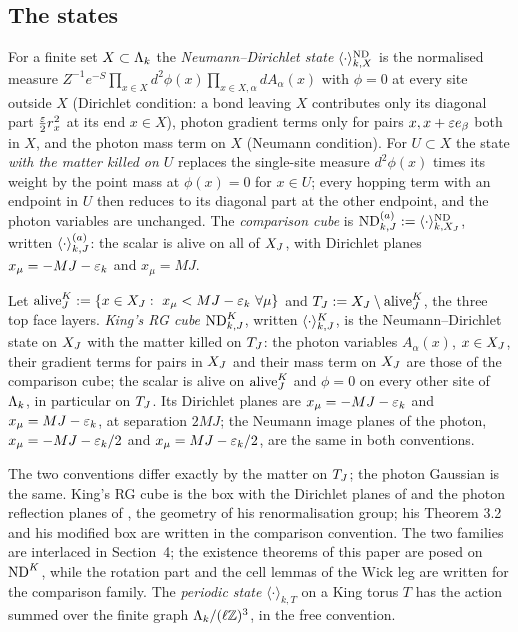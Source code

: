 \subsection{The states}

\begin{definition}\label{def:s02:acube}
For a finite set $X\subset\Lambda_k$ the \emph{Neumann--Dirichlet state} $\langle\cdot\rangle^{\mathrm{ND}}_{k,X}$ is the normalised measure $Z^{-1}e^{-S}\prod_{x\in X}d^2\phi(x)\prod_{x\in X,\alpha}dA_\alpha(x)$ with $\phi=0$ at every site outside $X$ (Dirichlet condition: a bond leaving $X$ contributes only its diagonal part $\frac{\varepsilon}2r_x^2$ at its end $x\in X$), photon gradient terms only for pairs $x,x+\varepsilon e_\beta$ both in $X$, and the photon mass term on $X$ (Neumann condition). For $U\subset X$ the state \emph{with the matter killed on $U$} replaces the single-site measure $d^2\phi(x)$ times its weight by the point mass at $\phi(x)=0$ for $x\in U$; every hopping term with an endpoint in $U$ then reduces to its diagonal part at the other endpoint, and the photon variables are unchanged. The \emph{comparison cube} is $\mathrm{ND}^{(a)}_{k,J}:=\langle\cdot\rangle^{\mathrm{ND}}_{k,X_J}$, written $\langle \cdot\rangle^{(a)}_{k,J}$: the scalar is alive on all of $X_J$, with Dirichlet planes $x_\mu=-MJ-\varepsilon_k$ and $x_\mu=MJ$.
\end{definition}

\begin{definition}\label{def:s02:Kcube}
Let $\alive^K_J\defeq\{x\in\XJ:\ x_\mu<MJ-\eps_k\ \forall\mu\}$ and $T_J:=X_J\setminus\operatorname{alive}^K_J$, the three top face layers. \emph{King's RG cube} $\mathrm{ND}^{K}_{k,J}$, written $\langle \cdot\rangle^{K}_{k,J}$, is the Neumann--Dirichlet state on $X_J$ with the matter killed on $T_J$: the photon variables $A_\alpha(x)$, $x\in X_J$, their gradient terms for pairs in $X_J$ and their mass term on $X_J$ are those of the comparison cube; the scalar is alive on $\operatorname{alive}^K_J$ and $\phi=0$ on every other site of $\Lambda_k$, in particular on $T_J$. Its Dirichlet planes are $x_\mu=-MJ-\varepsilon_k$ and $x_\mu=MJ-\varepsilon_k$, at separation $2MJ$; the Neumann image planes of the photon, $x_\mu=-MJ-\varepsilon_k/2$ and $x_\mu=MJ-\varepsilon_k/2$, are the same in both conventions.
\end{definition}

The two conventions differ exactly by the matter on $T_J$; the photon Gaussian is the same. King's RG cube is the box \cite[(3.3)--(3.4)]{K2} with the Dirichlet planes of \cite[(3.9)]{K2} and the photon reflection planes of \cite[(3.7)]{K2}, the geometry of his renormalisation group; his Theorem 3.2 and his modified box \cite[(3.38)]{K2} are written in the comparison convention. The two families are interlaced in Section~4; the existence theorems of this paper are posed on $\mathrm{ND}^{K}$, while the rotation part and the cell lemmas of the Wick leg are written for the comparison family. The \emph{periodic state} $\langle\cdot\rangle_{k,T}$ on a King torus $T$ has the action summed over the finite graph $\Lambda_k/(\ell\mathbb Z)^3$, in the free convention.

